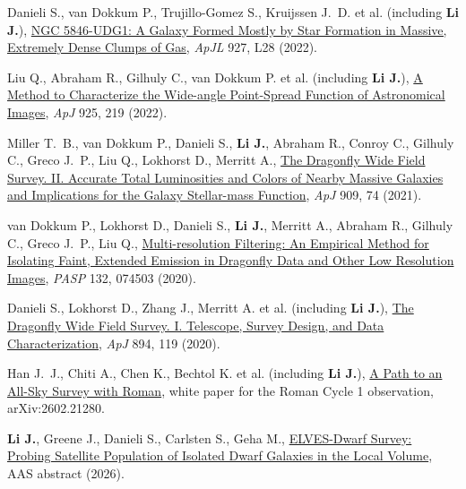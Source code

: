 \item Danieli S., van Dokkum P., Trujillo-Gomez S., Kruijssen J.~D. et al. (including \textbf{Li J.}), \href{https://ui.adsabs.harvard.edu/abs/2022ApJ...927L..28D}{NGC 5846-UDG1: A Galaxy Formed Mostly by Star Formation in Massive, Extremely Dense Clumps of Gas}, \textit{ApJL} 927, L28 (2022).

\item Liu Q., Abraham R., Gilhuly C., van Dokkum P. et al. (including \textbf{Li J.}), \href{https://ui.adsabs.harvard.edu/abs/2022ApJ...925..219L}{A Method to Characterize the Wide-angle Point-Spread Function of Astronomical Images}, \textit{ApJ} 925, 219 (2022).

\item Miller T.~B., van Dokkum P., Danieli S., \textbf{Li J.}, Abraham R., Conroy C., Gilhuly C., Greco J.~P., Liu Q., Lokhorst D., Merritt A., \href{https://ui.adsabs.harvard.edu/abs/2021ApJ...909...74M}{The Dragonfly Wide Field Survey. II. Accurate Total Luminosities and Colors of Nearby Massive Galaxies and Implications for the Galaxy Stellar-mass Function}, \textit{ApJ} 909, 74 (2021).

\item van Dokkum P., Lokhorst D., Danieli S., \textbf{Li J.}, Merritt A., Abraham R., Gilhuly C., Greco J.~P., Liu Q., \href{https://ui.adsabs.harvard.edu/abs/2020PASP..132g4503V}{Multi-resolution Filtering: An Empirical Method for Isolating Faint, Extended Emission in Dragonfly Data and Other Low Resolution Images}, \textit{PASP} 132, 074503 (2020).

\item Danieli S., Lokhorst D., Zhang J., Merritt A. et al. (including \textbf{Li J.}), \href{https://ui.adsabs.harvard.edu/abs/2020ApJ...894..119D}{The Dragonfly Wide Field Survey. I. Telescope, Survey Design, and Data Characterization}, \textit{ApJ} 894, 119 (2020).


\item Han J.~J., Chiti A., Chen K., Bechtol K. et al. (including \textbf{Li J.}), \href{https://ui.adsabs.harvard.edu/abs/2026arXiv260221280H}{A Path to an All-Sky Survey with Roman}, white paper for the Roman Cycle 1 observation, arXiv:2602.21280.

\item \textbf{Li J.}, Greene J., Danieli S., Carlsten S., Geha M., \href{https://ui.adsabs.harvard.edu/abs/2026AAS...24714504L}{ELVES-Dwarf Survey: Probing Satellite Population of Isolated Dwarf Galaxies in the Local Volume}, AAS abstract (2026).

